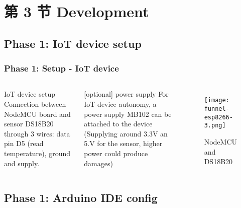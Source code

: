 \documentclass[
    aspectratio=169,                   %
]{beamer}
\begin{document}
\section{第 3 节 Development}

\subsection{Phase 1: IoT device setup}

    \begin{frame}
        \frametitle{Phase 1: Setup - IoT device}

        \begin{columns}[T,onlytextwidth]
              \begin{block}{IoT device setup}
                    Connection between NodeMCU board and sensor DS18B20 through 3 wires: data pin D5 (read temperature), ground and supply.
                \end{block}
                \begin{block}{[optional] power supply}
                    For IoT device autonomy, a power supply MB102 can be attached to the device (Supplying around 3.3V an 5.V for the sensor,  higher power could produce damages)
                \end{block}
            \begin{figure}
                \centering
                \begin{stampbox}
                    \texttt{[image: funnel-esp8266-3.png]}
                \end{stampbox}
                \caption{NodeMCU and DS18B20}
            \end{figure}        
        \end{columns}

    \end{frame}

\subsection{Phase 1: Arduino IDE config}
\end{document}
